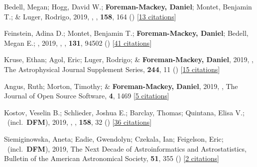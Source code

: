 \item[{\color{numcolor}\scriptsize48}] Bedell, Megan; Hogg, David W.; \textbf{Foreman-Mackey, Daniel}; Montet, Benjamin T.; \& Luger, Rodrigo, 2019, , \aj, \textbf{158}, 164 () [\href{https://ui.adsabs.harvard.edu/abs/2019AJ....158..164B}{13 citations}]

\item[{\color{numcolor}\scriptsize47}] Feinstein, Adina D.; Montet, Benjamin T.; \textbf{Foreman-Mackey, Daniel}; Bedell, Megan E.; \etal, 2019, , \pasp, \textbf{131}, 94502 () [\href{https://ui.adsabs.harvard.edu/abs/2019PASP..131i4502F}{41 citations}]

\item[{\color{numcolor}\scriptsize46}] Kruse, Ethan; Agol, Eric; Luger, Rodrigo; \& \textbf{Foreman-Mackey, Daniel}, 2019, , The Astrophysical Journal Supplement Series, \textbf{244}, 11 () [\href{https://ui.adsabs.harvard.edu/abs/2019ApJS..244...11K}{15 citations}]

\item[{\color{numcolor}\scriptsize45}] Angus, Ruth; Morton, Timothy; \& \textbf{Foreman-Mackey, Daniel}, 2019, , The Journal of Open Source Software, \textbf{4}, 1469 [\href{https://ui.adsabs.harvard.edu/abs/2019JOSS....4.1469A}{5 citations}]

\item[{\color{numcolor}\scriptsize44}] Kostov, Veselin B.; Schlieder, Joshua E.; Barclay, Thomas; Quintana, Elisa V.; \etal\ (incl.\ \textbf{DFM}), 2019, , \aj, \textbf{158}, 32 () [\href{https://ui.adsabs.harvard.edu/abs/2019AJ....158...32K}{36 citations}]

\item[{\color{numcolor}\scriptsize43}] Siemiginowska, Aneta; Eadie, Gwendolyn; Czekala, Ian; Feigelson, Eric; \etal\ (incl.\ \textbf{DFM}), 2019, The Next Decade of Astroinformatics and Astrostatistics, Bulletin of the American Astronomical Society, \textbf{51}, 355 () [\href{https://ui.adsabs.harvard.edu/abs/2019BAAS...51c.355S}{2 citations}]

